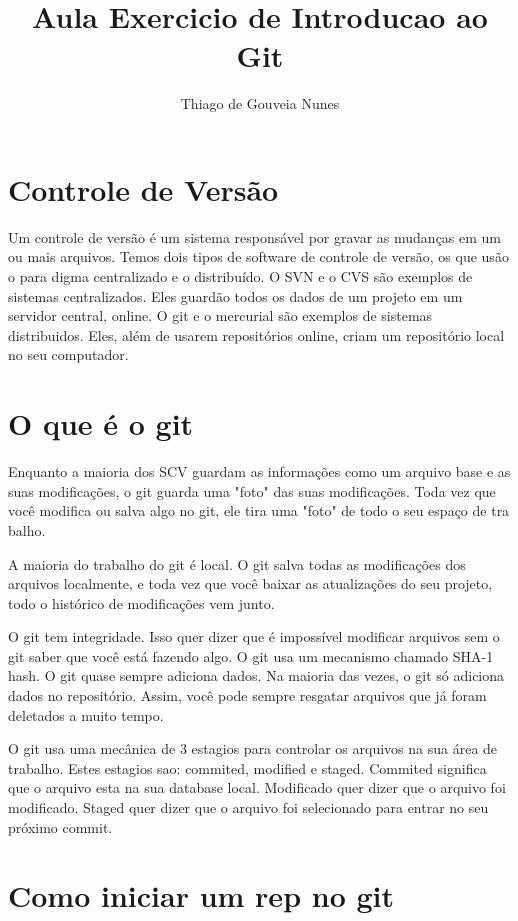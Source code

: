 \documentclass{article}
\begin{document}
\title{Aula Exercicio de Introducao ao Git}
\author{Thiago de Gouveia Nunes}
\maketitle

\section{Controle de Versão}
    Um controle de versão é um sistema responsável por gravar as mudanças em um
    ou mais arquivos.
    Temos dois tipos de software de controle de versão, os que usão o para
    digma centralizado e o distribuído. O SVN e o CVS são exemplos de sistemas
    centralizados. Eles guardão todos os dados de um projeto em um servidor central,
    online. O git e o mercurial são exemplos de sistemas distribuidos. Eles, além
    de usarem repositórios online, criam um repositório local no seu computador.

\section{O que é o git}
    Enquanto a maioria dos SCV guardam as informações como um arquivo base e as suas
    modificações, o git guarda uma "foto" das suas modificações. Toda vez que você
    modifica ou salva algo no git, ele tira uma "foto" de todo o seu espaço de tra
    balho.
    
    A maioria do trabalho do git é local. O git salva todas as modificações dos arquivos
    localmente, e toda vez que você baixar as atualizações do seu projeto, todo o
    histórico de modificações vem junto.
    
    O git tem integridade. Isso quer dizer que é impossível modificar arquivos sem o
    git saber que você está fazendo algo. O git usa um mecanismo chamado SHA-1 hash.
    O git quase sempre adiciona dados. Na maioria das vezes, o git só adiciona dados
    no repositório. Assim, você pode sempre resgatar arquivos que já foram deletados
    a muito tempo.
    
    O git usa uma mecânica de 3 estagios para controlar os arquivos na sua área de
    trabalho. Estes estagios sao: commited, modified e staged. Commited significa
    que o arquivo esta na sua database local. Modificado quer dizer que o arquivo
    foi modificado. Staged quer dizer que o arquivo foi selecionado para entrar no seu
    próximo commit.

\section{Como iniciar um rep no git}
\end{document}
